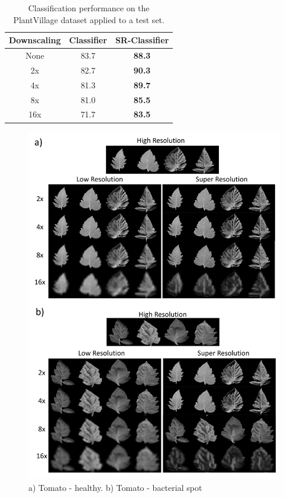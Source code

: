 \documentclass[10pt,twocolumn,letterpaper]{article}
\begin{document}
\begin{table}[h]
\caption{Classification performance on the PlantVillage dataset applied to a test set.}
\label{tab:results}
\centering
\begin{tabular}{|c|c|c|}
\hline
  Downscaling & Classifier & SR-Classifier \\
\hline
\hline
None & 83.7 & \textbf{88.3} \\
2x & 82.7 & \textbf{90.3} \\
4x & 81.3 & \textbf{89.7} \\
8x & 81.0 & \textbf{85.5} \\
16x & 71.7 & \textbf{83.5} \\
\hline
\end{tabular}
\end{table}

\begin{figure}[h]
\begin{center}
\includegraphics[scale=0.35]{results/srimages.pdf}
\end{center}
   \caption{a) Tomato - healthy. b) Tomato - bacterial spot} 
\label{fig:srimages}
\end{figure}
\end{document}
